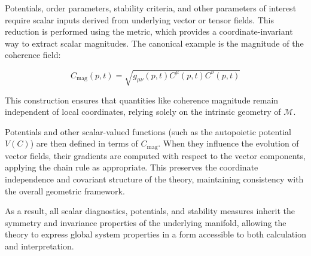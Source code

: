 Potentials, order parameters, stability criteria, and other parameters of interest require scalar inputs derived from underlying vector or tensor fields. This reduction is performed using the metric, which provides a coordinate-invariant way to extract scalar magnitudes. The canonical example is the magnitude of the coherence field:

\begin{equation}
C_{\mathrm{mag}}(p,t) = \sqrt{g_{\mu\nu}(p,t) C^\mu(p,t) C^\nu(p,t)}
\end{equation}

This construction ensures that quantities like coherence magnitude remain independent of local coordinates, relying solely on the intrinsic geometry of \(\mathcal{M}\).

Potentials and other scalar-valued functions (such as the autopoietic potential \(V(C)\)) are then defined in terms of \(C_{\mathrm{mag}}\). When they influence the evolution of vector fields, their gradients are computed with respect to the vector components, applying the chain rule as appropriate. This preserves the coordinate independence and covariant structure of the theory, maintaining consistency with the overall geometric framework.

As a result, all scalar diagnostics, potentials, and stability measures inherit the symmetry and invariance properties of the underlying manifold, allowing the theory to express global system properties in a form accessible to both calculation and interpretation.